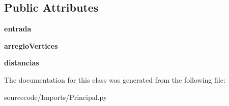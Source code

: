 \subsection*{Public Attributes}
\begin{DoxyCompactItemize}
\item 
\mbox{\label{class_imports_1_1_principal_1_1_principal_a26f556fca3f8707beb54319846e9270f}} 
{\bfseries entrada}
\item 
\mbox{\label{class_imports_1_1_principal_1_1_principal_ac611e07a1a4bccd593c7412d8f23a6d2}} 
{\bfseries arreglo\+Vertices}
\item 
\mbox{\label{class_imports_1_1_principal_1_1_principal_ab42455f4dc6c24a21bcd849a6ca01f49}} 
{\bfseries distancias}
\end{DoxyCompactItemize}


The documentation for this class was generated from the following file\+:\begin{DoxyCompactItemize}
\item 
sourcecode/\+Imports/Principal.\+py\end{DoxyCompactItemize}
